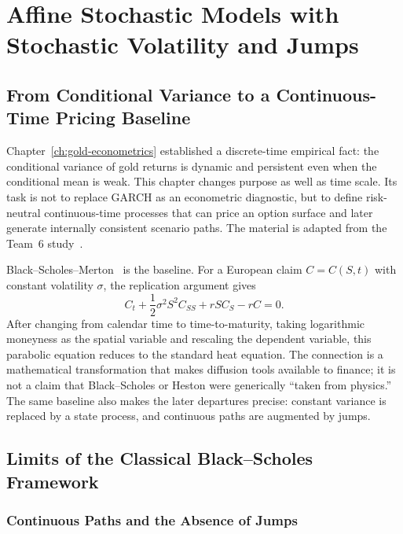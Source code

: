 \chapter{Affine Stochastic Models with Stochastic Volatility and Jumps}
\label{ch:sv-jumps}
\section{From Conditional Variance to a Continuous-Time Pricing Baseline}

Chapter~\ref{ch:gold-econometrics} established a discrete-time empirical fact: the conditional variance
of gold returns is dynamic and persistent even when the conditional mean is
weak. This chapter changes purpose as well as time scale. Its task is not to
replace GARCH as an econometric diagnostic, but to define risk-neutral
continuous-time processes that can price an option surface and later generate
internally consistent scenario paths. The material is adapted from the Team~6
study~\cite{team6}.

Black--Scholes--Merton~\cite{BlackScholes1973,Merton1973} is the baseline. For a European claim
$C=C(S,t)$ with constant volatility $\sigma$, the replication argument gives
\[
 C_t+\frac{1}{2}\sigma^2S^2C_{SS}+rSC_S-rC=0.
\]
After changing from calendar time to time-to-maturity, taking logarithmic
moneyness as the spatial variable and rescaling the dependent variable, this
parabolic equation reduces to the standard heat equation. The connection is a
mathematical transformation that makes diffusion tools available to finance;
it is not a claim that Black--Scholes or Heston were generically ``taken from
physics.'' The same baseline also makes the later departures precise: constant
variance is replaced by a state process, and continuous paths are augmented by
jumps.

\section{Limits of the Classical Black–Scholes Framework}
\subsection{Continuous Paths and the Absence of Jumps}

